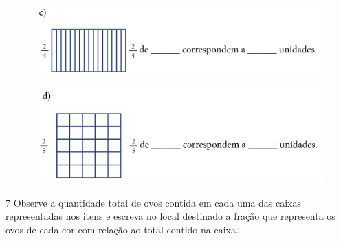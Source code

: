 
\begin{figure}[htpb!]
\includegraphics[width=.8\textwidth]{../ilustracoes/MAT5/SAEB_5ANO_MAT_figura74-3.png}
\end{figure}


\begin{figure}[htpb!]
\includegraphics[width=.8\textwidth]{../ilustracoes/MAT5/SAEB_5ANO_MAT_figura74-4.png}
\end{figure}


\num{7} Observe a quantidade total de ovos contida em cada uma das caixas
representadas nos itens e escreva no local destinado a fração que
representa os ovos de cada cor com relação ao total contido na caixa.

